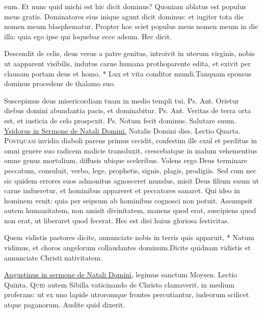 \begin{multicols*}{2}
eum. Et nunc quid michi est hic dicit dominus? Quoniam ablatus est populus meus gratis. Dominatores eius inique agunt dicit dominus: et iugiter tota die nomen meum blasphematur. Propter hoc sciet populus meus nomen meum in die illa: quia ego ipse qui loquebar ecce adsum. Hec dicit.
\begin{responsory-doxology}
{Descendit de celis, deus verus a patre genitus, introivit in uterum virginis, nobis ut aapparent visibilis, indutus carne humana prothoparente edita, et exivit per clausam portam deus et homo, * Lux et vita conditor mundi.}{Tanquam sponsus dominus procedens de thalamo suo.}
\end{responsory-doxology}
 Suscepimus deus misericordiam tuam in medio templi tui. {\color{Red} Ps.}  {\color{Red} Ant.} Orietur diebus domini abundantia pacis, et dominabitur. {\color{Red} Ps.}  {\color{Red} Ant.} Veritas de terra orta est, et iusticia de celo prospexit. {\color{Red} Ps.}  \V Notum fecit dominus. \R Salutare suum.
\newline \ul{Ysidorus in Sermone de Natali Domini.} Natalis Domini dies. 
{\color{Red} Lectio Quarta.}
\lettrine[lines=2]{\zallmancaps \color{Blue} P}{ostquam} invidia diaboli parens primus cecidit, confestim ille exul et perditus in omni genere suo radicem malicie transduxit, crescebatque in malum vehementius omne genus mortalium, diffusis ubique sceleribus. Volens ergo Deus terminare peccatum, consuluit, verbo, lege, prophetis, signis, plagis, prodigiis. Sed cum nec sic quidem errores suos admonitus agnosceret mundus, misit Deus filium suum ut carne indueretur, et hominibus appareret et peccatores sanaret. Qui ideo in hominem venit: quia per seipsum ab hominibus cognosci non potuit. Assumpsit autem humanitatem, non amisit divinitatem, manens quod erat, suscipiens quod non erat, ut liberaret quod fecerat. Hec est diei huius gloriosa festivitas.
\begin{responsory}
{Quem vidistis pastores dicite, annunciate nobis in terris quis apparuit, * Natum vidimus, et choros angelorum collaudantes dominum.}{Dicite quidnam vidistis et annunciate Christi nativitatem.}
\end{responsory}
\newline \ul{Augustinus in sermone de Natali Domini,} legimus sanctum Moysen.
{\color{Red} Lectio Quinta.}
\lettrine[lines=2]{\zallmancaps \color{Red} Q}{uid} autem Sibilla vaticinando de Christo clamaverit, in medium proferans: ut ex uno lapide utroromque frontes percutiantur, iudeorum scilicet atque paganorum. Audite quid dixerit.

\end{multicols*}
